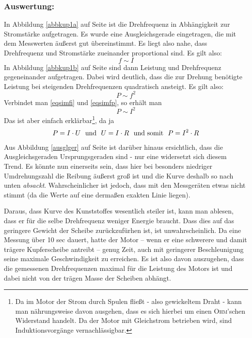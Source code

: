 		\subsubsection*{Auswertung:}
In Abbildung \ref{abbkup1a} auf Seite \pageref{abbkup1a} ist die Drehfrequenz in Abhängigkeit zur Stromstärke aufgetragen. Es wurde eine Ausgleichsgerade eingetragen, die mit dem Messwerten äußerst gut übereinstimmt. Es liegt also nahe, dass Drehfrequenz und Stromstärke zueinander proportional sind. Es gilt also:
\begin{equation}
f \sim I
\label{eqsimfi}
\end{equation}
In Abbildung \ref{abbkup1b} auf Seite \pageref{abbkup1b} sind dann Leistung und Drehfrequenz gegeneinander aufgetragen. Dabei wird deutlich, dass die zur Drehung benötigte Leistung bei steigenden Drehfrequenzen quadratisch ansteigt. Es gilt also: 
\begin{equation}
P \sim f^2
\label{eqsimfp}
\end{equation}
Verbindet man \ref{eqsimfi} und \ref{eqsimfp}, so erhält man
\begin{equation}
P \sim I^2
\end{equation}
Das ist aber einfach erklärbar\footnote{Da im Motor der Strom durch Spulen fließt - also gewickeltem Draht - kann man nährungsweise davon ausgehen, dass es sich hierbei um einen \textsc{Ohm}'schen Widerstand handelt. Da der Motor mit Gleichstrom betrieben wird, sind Induktionsvorgänge vernachlässigbar.}, da ja 
\begin{equation}
P = I \cdot U ~~  \textnormal{und} ~~ U = I \cdot R ~~ \textnormal{und somit} ~~ P = I^2 \cdot R
\label{eq:ohmges}
\end{equation}
Aus Abbildung \ref{ausglger} auf Seite \pageref{ausglger} ist darüber hinaus ersichtlich, dass die Ausgleichsgeraden Ursprungsgeraden sind - nur eine widersetzt sich diesem Trend. Es könnte nun einerseits sein, dass hier bei besonders niedriger Umdrehungszahl die Reibung äußerst groß ist und die Kurve deshalb so nach unten \textit{absackt}. Wahrscheinlicher ist jedoch, dass mit den Messgeräten etwas nicht stimmt (da die Werte auf eine dermaßen exakten Linie liegen).

Daraus, dass Kurve des Kunststoffes wesentlich steiler ist, kann man ablesen, dass er für die selbe Drehfrequenz weniger Energie braucht. Dass dies auf das geringere Gewicht der Scheibe zurückzufürhen ist, ist unwahrscheinlich. Da eine Messung über 10 sec dauert, hatte der Motor -- wenn er eine schwerere und damit trägere Kupferscheibe antreibt -- genug Zeit, auch mit geringerer Beschleunigung seine maximale Geschwindigkeit zu erreichen. Es ist also davon auszugehen, dass die gemessenen Drehfrequenzen maximal für die Leistung des Motors ist und dabei nicht von der trägen Masse der Scheiben abhängt. 

